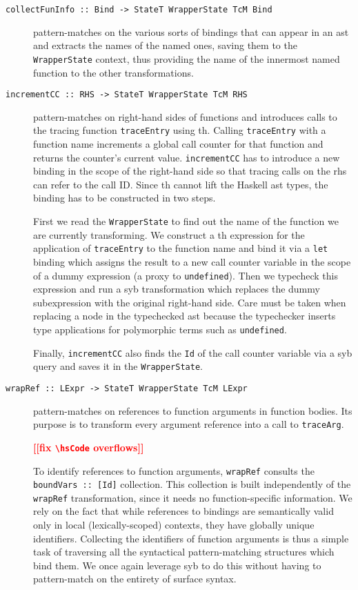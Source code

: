 \documentclass[thesis=B,english]{FITthesis}[2019/12/23]
\newcommand{\todo}[1]{\textcolor{red}{\textbf{[[#1]]}}}
\newcommand{\hsType}[1]{\texttt{#1}}
\newcommand{\hsIdent}[1]{\texttt{#1}}
\newcommand{\hsCode}[1]{\texttt{#1}}
\begin{document}
\begin{description}
	\item[\hsCode{collectFunInfo :: Bind -> StateT WrapperState TcM Bind}]
		pattern-matches on the various sorts of bindings that can appear in an
		\acrshort{ast} and extracts the names of the named ones, saving them to
		the \hsType{WrapperState} context, thus providing the name of the
		innermost named function to the other transformations.

	\item[\hsCode{incrementCC :: RHS -> StateT WrapperState TcM RHS}]
		pattern-matches on right-hand sides of functions and introduces calls
		to the tracing function \hsIdent{traceEntry} using \acrfull{th}.
		Calling \hsIdent{traceEntry} with a function name increments a global
		call counter for that function and returns the counter's current value.
		\hsIdent{incrementCC} has to introduce a new binding in the scope of
		the right-hand side so that tracing calls on the \acrshort{rhs} can
		refer to the call ID.  Since \acrshort{th} cannot lift the Haskell
		\acrshort{ast} types, the binding has to be constructed in two steps.

		First we read the \hsType{WrapperState} to find out the name of the
		function we are currently transforming. We construct a \acrshort{th}
		expression for the application of \hsIdent{traceEntry} to the function
		name and bind it via a \hsCode{let} binding which assigns the result to
		a new call counter variable in the scope of a dummy expression (a proxy
		to \hsIdent{undefined}). Then we typecheck this expression and run a
		\acrshort{syb} transformation which replaces the dummy subexpression
		with the original right-hand side. Care must be taken when replacing a
		node in the typechecked \acrshort{ast} because the typechecker inserts
		type applications for polymorphic terms such as \hsIdent{undefined}.

		Finally, \hsIdent{incrementCC} also finds the \hsType{Id} of the call
		counter variable via a \acrshort{syb} query and saves it in the
		\hsType{WrapperState}.

	\item[\hsCode{wrapRef :: LExpr -> StateT WrapperState TcM LExpr}]
		pattern-matches on references to function arguments in function bodies.
		Its purpose is to transform every argument reference into a call to
		\hsIdent{traceArg}.

		\todo{fix \texttt{\textbackslash hsCode} overflows}

		To identify references to function arguments, \hsIdent{wrapRef}
		consults the \hsCode{boundVars :: [Id]} collection. This collection is built
		independently of the \hsIdent{wrapRef} transformation, since it needs
		no function-specific information. We rely on the fact that while
		references to bindings are semantically valid only in local
		(lexically-scoped) contexts, they have globally unique identifiers.
		Collecting the identifiers of function arguments is thus a simple task
		of traversing all the syntactical pattern-matching structures which
		bind them. We once again leverage \acrshort{syb} to do this without
		having to pattern-match on the entirety of surface syntax.


\end{description}
\end{document}
